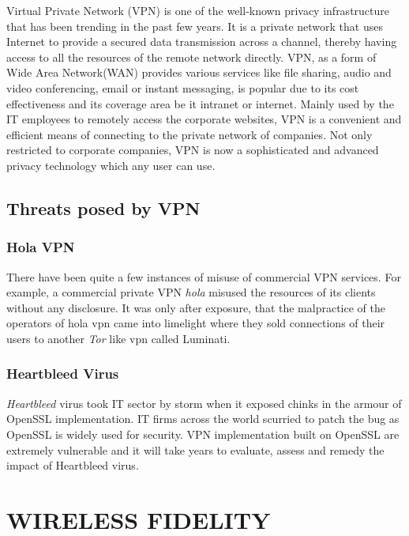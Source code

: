 \documentclass[letterpaper, 10 pt, conference]{ieeeconf}
\begin{document}
Virtual Private Network (VPN) is one of the well-known privacy infrastructure that has been trending in the past few years. It is a private network that uses Internet to provide a secured data transmission across a channel, thereby having access to all the resources of the remote network directly. VPN, as a form of Wide Area Network(WAN) provides various services like file sharing, audio and video conferencing, email or instant messaging, is popular due to its cost effectiveness and its coverage area be it intranet or internet. Mainly used by the IT employees to remotely access the corporate websites, VPN is a convenient and efficient means of connecting to the private network of companies. Not only restricted to corporate companies, VPN is now a sophisticated and advanced privacy technology which any user can use.\\

\subsection{Threats posed by VPN}

\subsubsection{Hola VPN}

There have been quite a few instances of misuse of commercial VPN services. For example, a commercial private VPN \textit{hola} misused the resources of its clients without any disclosure. It was only after exposure, that the malpractice of the operators of hola vpn came into limelight where they sold connections of their users to another \textit{Tor} like vpn called Luminati.\\

\subsubsection{Heartbleed Virus}
\textit{Heartbleed} virus took IT sector by storm when it exposed chinks in the armour of OpenSSL implementation. IT firms across the world scurried to patch the bug as OpenSSL is widely used for security. VPN implementation built on OpenSSL are extremely vulnerable and it will take years to evaluate, assess and remedy the impact of Heartbleed virus.\\

\section{WIRELESS FIDELITY}
\end{document}

